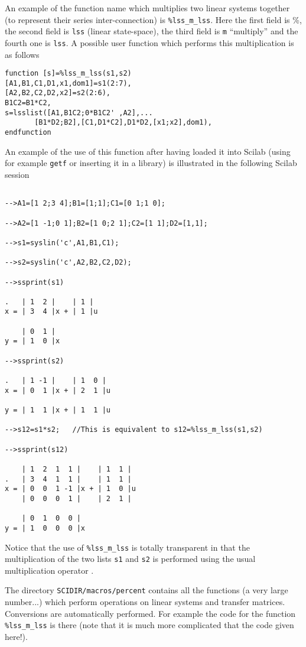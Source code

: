        An example of the function name which multiplies two
linear systems together (to represent their series inter-connection)
is {\tt \%lss\_m\_lss}.  Here the first field is \%, the second field is 
{\tt lss} (linear state-space), the third field is {\tt m} ``multiply''
and the fourth one is {\tt lss}. A possible user function which performs
this multiplication is as follows
\begin{verbatim}
function [s]=%lss_m_lss(s1,s2)
[A1,B1,C1,D1,x1,dom1]=s1(2:7),
[A2,B2,C2,D2,x2]=s2(2:6),
B1C2=B1*C2,
s=lsslist([A1,B1C2;0*B1C2' ,A2],...
       [B1*D2;B2],[C1,D1*C2],D1*D2,[x1;x2],dom1),
endfunction
\end{verbatim}
An example of the use of this function after having loaded it into
Scilab (using for example {\tt getf} or inserting it in a library) 
is illustrated in the following Scilab session
\begin{verbatim}
 
-->A1=[1 2;3 4];B1=[1;1];C1=[0 1;1 0];
 
-->A2=[1 -1;0 1];B2=[1 0;2 1];C2=[1 1];D2=[1,1];
 
-->s1=syslin('c',A1,B1,C1);
 
-->s2=syslin('c',A2,B2,C2,D2);
 
-->ssprint(s1)
 
.   | 1  2 |    | 1 |    
x = | 3  4 |x + | 1 |u   
 
    | 0  1 |    
y = | 1  0 |x   
 
-->ssprint(s2)
 
.   | 1 -1 |    | 1  0 |    
x = | 0  1 |x + | 2  1 |u   
 
y = | 1  1 |x + | 1  1 |u   
 
-->s12=s1*s2;   //This is equivalent to s12=%lss_m_lss(s1,s2)
 
-->ssprint(s12)
 
    | 1  2  1  1 |    | 1  1 |    
.   | 3  4  1  1 |    | 1  1 |    
x = | 0  0  1 -1 |x + | 1  0 |u   
    | 0  0  0  1 |    | 2  1 |    
 
    | 0  1  0  0 |    
y = | 1  0  0  0 |x   
\end{verbatim}
Notice that the use of {\tt \%lss\_m\_lss} is totally transparent in
that the multiplication of the two lists {\tt s1} and {\tt s2}
is performed using the usual multiplication operator {\tt *}.

The directory {\tt SCIDIR/macros/percent} contains all the functions
(a very large number...) which perform operations on linear systems
and transfer matrices. Conversions are automatically performed.
For example the code for the function {\tt \%lss\_m\_lss} is there (note
that it is much more complicated that the code given here!).
